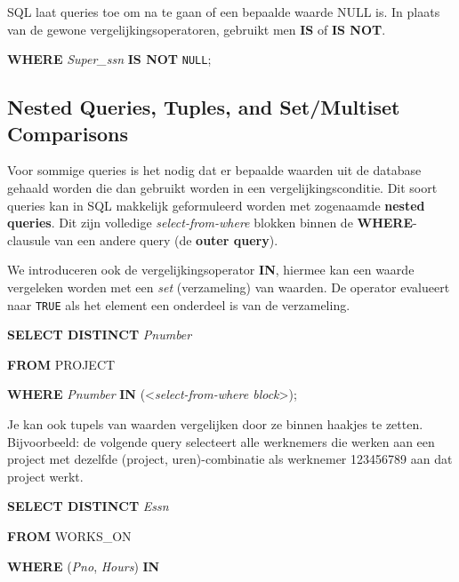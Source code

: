 SQL laat queries toe om na te gaan of een bepaalde waarde NULL is. In plaats van de gewone vergelijkingsoperatoren, gebruikt men \textbf{IS} of \textbf{IS NOT}.

\vspace{1mm}\hspace{10mm}
\textbf{WHERE} \textit{Super\_ssn} \textbf{IS NOT} \texttt{NULL};


\subsection{Nested Queries, Tuples, and Set/Multiset Comparisons}
Voor sommige queries is het nodig dat er bepaalde waarden uit de database gehaald worden die dan gebruikt worden in een vergelijkingsconditie. Dit soort queries kan in SQL makkelijk geformuleerd worden met zogenaamde \textbf{nested queries}. Dit zijn volledige \textit{select-from-where} blokken binnen de \textbf{WHERE}-clausule van een andere query (de \textbf{outer query}).

We introduceren ook de vergelijkingsoperator \textbf{IN}, hiermee kan een waarde vergeleken worden met een \textit{set} (verzameling) van waarden. De operator evalueert naar \texttt{TRUE} als het element een onderdeel is van de verzameling.

\vspace{1mm}\hspace{10mm}
\textbf{SELECT DISTINCT} \textit{Pnumber}

\hspace{10mm}
\textbf{FROM} PROJECT

\hspace{10mm}
\textbf{WHERE} \textit{Pnumber} \textbf{IN} ({\textless}\textit{select-from-where block}{\textgreater});
\vspace{3mm}

\noindent Je kan ook tupels van waarden vergelijken door ze binnen haakjes te zetten. Bijvoorbeeld: de volgende query selecteert alle werknemers die werken aan een project met dezelfde (project, uren)-combinatie als werknemer 123456789 aan dat project werkt.

\vspace{1mm}\hspace{10mm}
\textbf{SELECT DISTINCT} \textit{Essn}

\hspace{10mm}
\textbf{FROM} WORKS\_ON

\hspace{10mm}
\textbf{WHERE} (\textit{Pno}, \textit{Hours}) \textbf{IN}

